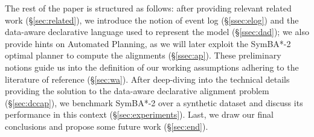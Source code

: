 The rest of the paper is structured as follows: after providing relevant related work (\S\ref{sec:related}), we introduce the notion of event log (\S\ref{ssec:elog}) and the data-aware declarative language used to represent the model (\S\ref{ssec:dad}); we also provide hints on Automated Planning, as we will later exploit the SymBA*-2 optimal planner \cite{torralba2014symba} to compute the alignments (\S\ref{ssec:ap}). These preliminary notions guide us into the definition of our  working assumptions adhering to the literature of reference (\S\ref{sec:wa}). After deep-diving into the technical details providing the solution to the data-aware declarative alignment problem (\S\ref{sec:dccap}), we benchmark SymBA*-2 over a synthetic dataset and discuss its performance in this context (\S\ref{sec:experiments}). Last, we draw our final conclusions and propose some future work (\S\ref{sec:end}).


